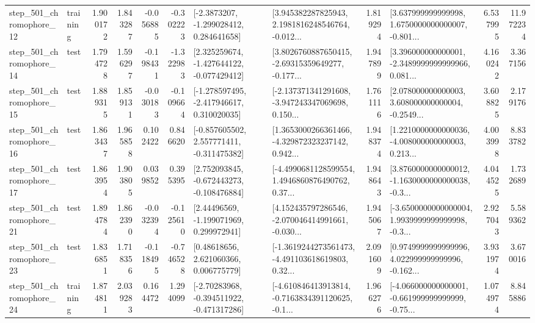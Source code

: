 \begin{tabular}{llrrrrllrlrr}
  step\_501\_chromophore\_12 &  training &      1.900172 &    1.843287 &     -0.056885 & -0.302223 &     [-2.3873207, -1.299028412, 0.284641658] &  [3.945382287825943, 2.1981816248546764, -0.012... &       1.819294 &  [3.637999999999998, 1.6750000000000007, -0.801... &            6.537995 &         11.972234 \\
  step\_501\_chromophore\_14 &      test &      1.794728 &    1.596297 &     -0.198431 & -1.322983 &   [2.325259674, -1.427644122, -0.077429412] &  [3.8026760887650415, -2.69315359649277, -0.177... &       1.947899 &  [3.396000000000001, -2.3489999999999966, 0.081... &            4.160242 &          3.367156 \\
  step\_501\_chromophore\_15 &      test &      1.889315 &    1.859131 &     -0.030183 & -0.109664 &   [-1.278597495, -2.417946617, 0.310020035] &  [-2.137371341291608, -3.947243347069698, 0.150... &       1.761116 &  [2.078000000000003, 3.608000000000004, -0.2549... &            3.608825 &          2.179176 \\
  step\_501\_chromophore\_16 &      test &      1.863437 &    1.965858 &      0.102422 &  0.846620 &   [-0.857605502, 2.557771411, -0.311475382] &  [1.3653000266361466, -4.329872323237142, 0.942... &       1.948374 &  [1.2210000000000036, -4.008000000000003, 0.213... &            4.003998 &          8.833782 \\
  step\_501\_chromophore\_17 &      test &      1.863954 &    1.903805 &      0.039852 &  0.395395 &   [2.752093845, -0.672443273, -0.108476884] &  [-4.4990681128599554, 1.4946860876490762, 0.37... &       1.948643 &  [3.8760000000000012, -1.1630000000000038, -0.3... &            4.044525 &          1.732689 \\
  step\_501\_chromophore\_21 &      test &      1.894784 &    1.862390 &     -0.032394 & -0.125610 &     [2.44496569, -1.199071969, 0.299972941] &  [4.152435797286546, -2.070046414991661, -0.030... &       1.945067 &  [-3.6500000000000004, 1.9939999999999998, -0.3... &            2.927043 &          5.589362 \\
  step\_501\_chromophore\_23 &      test &      1.836851 &    1.718356 &     -0.118495 & -0.746528 &      [0.48618656, 2.621060366, 0.006775779] &  [-1.3619244273561473, -4.491103618619803, 0.32... &       2.091609 &  [0.9749999999999996, 4.022999999999996, -0.162... &            3.931974 &          3.670016 \\
  step\_501\_chromophore\_24 &  training &      1.874811 &    2.039283 &      0.164472 &  1.294099 &   [-2.70283968, -0.394511922, -0.471317286] &  [-4.610846413913814, -0.7163834391120625, -0.1... &       1.966276 &  [-4.066000000000001, -0.661999999999999, -0.75... &            1.074974 &          8.845886 \\

\end{tabular}

